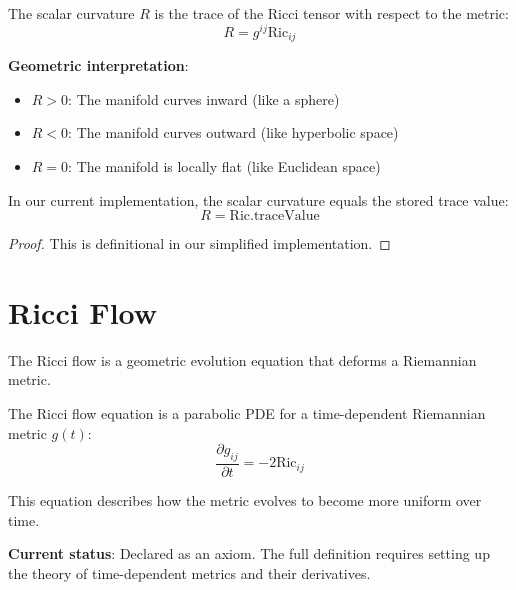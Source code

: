 \begin{definition}
\label{def:scalar_curvature}
\leanok
{}
The scalar curvature $R$ is the trace of the Ricci tensor with respect to the metric:
\[ R = g^{ij} \mathrm{Ric}_{ij} \]

\textbf{Geometric interpretation}:
\begin{itemize}
\item $R > 0$: The manifold curves inward (like a sphere)
\item $R < 0$: The manifold curves outward (like hyperbolic space)
\item $R = 0$: The manifold is locally flat (like Euclidean space)
\end{itemize}
\end{definition}

\begin{lemma}
\label{lem:scalar_curvature_eq}
\leanok
{}
In our current implementation, the scalar curvature equals the stored trace value:
\[ R = \mathrm{Ric}.\mathrm{traceValue} \]
\end{lemma}

\begin{proof}
\leanok
This is definitional in our simplified implementation.
\end{proof}

\chapter{Ricci Flow}
\label{chap:flow}

The Ricci flow is a geometric evolution equation that deforms a Riemannian metric.

\begin{definition}
\label{def:ricci_flow_equation}
The Ricci flow equation is a parabolic PDE for a time-dependent Riemannian metric $g(t)$:
\[ \frac{\partial g_{ij}}{\partial t} = -2 \mathrm{Ric}_{ij} \]

This equation describes how the metric evolves to become more uniform over time.

\textbf{Current status}: Declared as an axiom. The full definition requires
setting up the theory of time-dependent metrics and their derivatives.
\end{definition}


